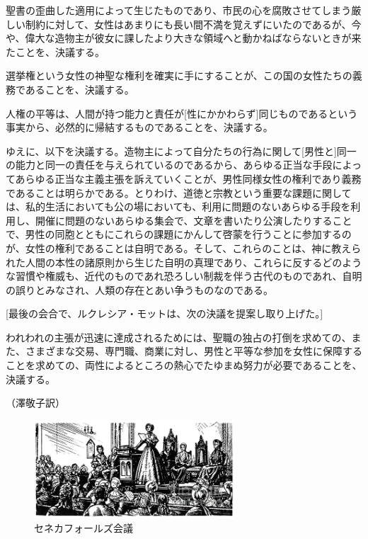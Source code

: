 聖書の歪曲した適用によって生じたものであり、市民の心を腐敗させてしまう厳しい制約に対して、女性はあまりにも長い間不満を覚えずにいたのであるが、今や、偉大な造物主が彼女に課したより大きな領域へと動かねばならないときが来たことを、決議する。

選挙権という女性の神聖な権利を確実に手にすることが、この国の女性たちの義務であることを、決議する。

人権の平等は、人間が持つ能力と責任が[性にかかわらず]同じものであるという事実から、必然的に帰結するものであることを、決議する。

ゆえに、以下を決議する。造物主によって自分たちの行為に関して[男性と]同一の能力と同一の責任を与えられているのであるから、あらゆる正当な手段によってあらゆる正当な主義主張を訴えていくことが、男性同様女性の権利であり義務であることは明らかである。とりわけ、道徳と宗教という重要な課題に関しては、私的生活においても公の場においても、利用に問題のないあらゆる手段を利用し、開催に問題のないあらゆる集会で、文章を書いたり公演したりすることで、男性の同胞とともにこれらの課題にかんして啓蒙を行うことに参加するのが、女性の権利であることは自明である。そして、これらのことは、神に教えられた人間の本性の諸原則から生じた自明の真理であり、これらに反するどのような習慣や権威も、近代のものであれ恐ろしい制裁を伴う古代のものであれ、自明の誤りとみなされ、人類の存在とあい争うものなのである。

[最後の会合で、ルクレシア・モットは、次の決議を提案し取り上げた。]

われわれの主張が迅速に達成されるためには、聖職の独占の打倒を求めての、また、さまざまな交易、専門職、商業に対し、男性と平等な参加を女性に保障することを求めての、両性によるところの熱心でたゆまぬ努力が必要であることを、決議する。
\begin{flushright}
  （澤敬子訳）
\end{flushright}


  \begin{figure}[htbp]
    \centering
      \includegraphics[width=75mm]{images/seneca-falls.jpg}
    \caption{セネカフォールズ会議}
  \end{figure}





